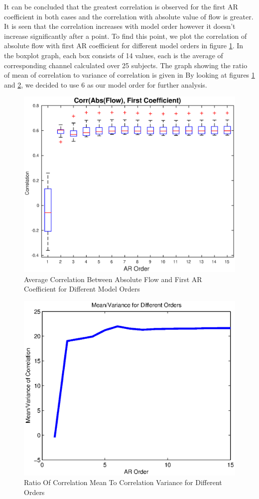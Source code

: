 \documentclass[a4paper,onesided,12pt]{report}
\begin{document}
It can be concluded that the greatest correlation is observed for the first AR coefficient in both cases and the correlation with absolute value of flow is greater. It is seen that the correlation increases with model order however it doesn't increase significantly after a point. To find this point, we plot the correlation of absolute flow with first AR coefficient for different model orders in figure \ref{winArAbsFirst}. In the boxplot graph, each box consists of 14 values, each is the average of corresponding channel calculated over 25 subjects. The graph showing the ratio of mean of correlation to variance of correlation is given in By looking at figures \ref{winArAbsFirst} and \ref{winArAbsFirstMeanVar}, we decided to use 6 as our model order for further analysis.
\begin{figure}[H]
	\centering
	\includegraphics[width=0.8\linewidth]{windowAr_AbsFirst.eps}
	\caption{Average Correlation Between Absolute Flow and First AR Coefficient for Different Model Orders}
	\label{winArAbsFirst}
\end{figure}
\begin{figure}[H]
	\centering
	\includegraphics[width=0.8\linewidth]{windowedAr_MeanOverVarForOrders.eps}
	\caption{Ratio Of Correlation Mean To Correlation Variance for Different Orders}
	\label{winArAbsFirstMeanVar}
\end{figure}
\end{document}
